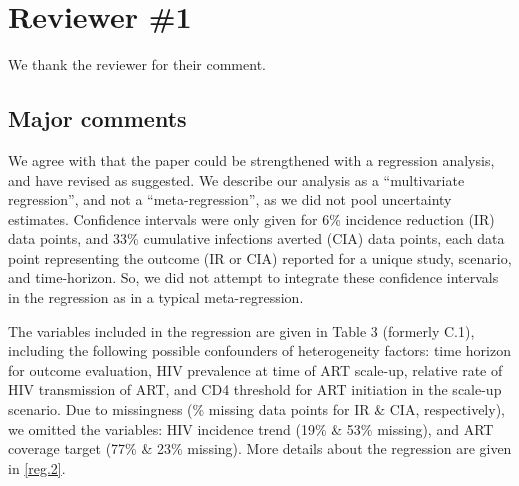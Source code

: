 \section{Reviewer \#1}
\begin{comment}[*]
This paper by Knight and colleagues reviews mathematical models of the impact of antiretroviral treatment (ART) on HIV incidence. A particular focus is on differences between models in terms of how they represent heterogeneity in HIV risk, and how this heterogeneity influences the predicted impact of ART on HIV incidence. The review is thorough and clearly presented.
\end{comment}
\begin{response}
We thank the reviewer for their comment.
\end{response}
\subsection{Major comments}
\begin{comment}\label{reg.1}
A limitation of this review, which the authors acknowledge, is that it is essentially an ecological analysis. Although there is an association between models allowing for heterogeneity in risk behaviour and models predicting smaller ART impacts on HIV incidence, this finding doesn't necessarily prove that heterogeneity in risk behaviour determines the extent of the ART impact. There are many possible confounders and other variables that influence the extent of the modelled reductions in HIV incidence, as the authors note. Would it not make more sense to use a meta-regression approach to isolate the effect of the heterogeneity assumptions, controlling for the confounding factors? Although this wouldn't completely get around the causality conundrum, it would be better than the current approach, which is effectively relying on univariable rather than multivariable analysis.
\end{comment}
\begin{response}
We agree with that the paper could be strengthened with a regression analysis,
and have revised as suggested.
We describe our analysis as a ``multivariate regression'', and not a ``meta-regression'',
as we did not pool uncertainty estimates.
Confidence intervals were only given for
6\% incidence reduction (IR) data points, and
33\% cumulative infections averted (CIA) data points,
each data point representing the outcome (IR or CIA) reported for a unique study, scenario, and time-horizon.
So, we did not attempt to integrate these confidence intervals in the regression as in a typical meta-regression.
\par
The variables included in the regression are given in Table 3 (formerly C.1),
including the following possible confounders of heterogeneity factors:
time horizon for outcome evaluation,
HIV prevalence at time of ART scale-up,
relative rate of HIV transmission of ART, and
CD4 threshold for ART initiation in the scale-up scenario.
Due to missingness (\% missing data points for IR \& CIA, respectively), we omitted the variables:
HIV incidence trend (19\% \& 53\% missing), and ART coverage target (77\% \& 23\% missing).
More details about the regression are given in \ref{reg.2}.
\end{response}
